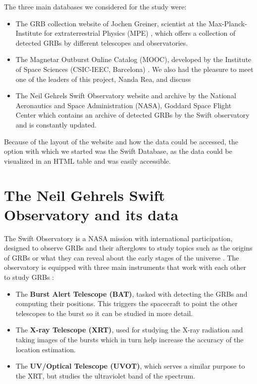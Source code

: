 The three main databases we considered for the study were:

\begin{itemize}
\item The GRB collection website of Jochen Greiner, scientist at the Max-Planck-Institute for extraterrestrial Physics (MPE) \cite{greinergrb},  which offers a collection of detected GRBs by different telescopes and observatories.
\item The Magnetar Outburst Online Catalog (MOOC), developed by the Institute of Space Sciences (CSIC-IEEC, Barcelona) \cite{moocgrbs}. We also had the pleasure to meet one of the leaders of this project, Nanda Rea, and discuss
\item The Neil Gehrels Swift Observatory website and archive by the National Aeronautics and Space Administration (NASA), Goddard Space Flight Center \cite{swiftnasa} which contains an archive of detected GRBs by the Swift observatory and is constantly updated.
\end{itemize}

Because of the layout of the website and how the data could be accessed, the option with which we started was the Swift Database, as the data could be visualized in an HTML table and was easily accessible.

\section{The Neil Gehrels Swift Observatory and its data}

The Swift Observatory is a NASA mission with international participation, designed to observe GRBs and their afterglows to study topics such as the origins of GRBs or what they can reveal about the early stages of the universe \cite{roming2005swift}. The observatory is equipped with three main instruments that work with each other to study GRBs \cite{gehrels2004swift} \cite{swiftnasa}:

\begin{itemize}
\item The \textbf{Burst Alert Telescope (BAT)}, tasked with detecting the GRBs and computing their positions. This triggers the spacecraft to point the other telescopes to the burst so it can be studied in more detail. 
\item The \textbf{X-ray Telescope (XRT)}, used for studying the X-ray radiation and taking images of the bursts which in turn help increase the accuracy of the location estimation.
\item The \textbf{UV/Optical Telescope (UVOT)}, which serves a similar purpose to the XRT, but studies the ultraviolet band of the spectrum. 
\end{itemize}


